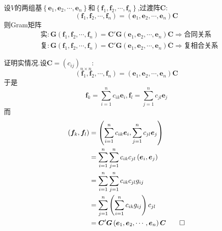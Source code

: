 \begin{green}
    \begin{lemma}[不同基之间的Gram矩阵的关系]\label{lem:不同基之间的Gram矩阵的关系}
        设$V$的两组基$\left\{
            \bm{e}_1,\bm{e}_2,\cdots,\bm{e}_n
        \right\}$和$\left\{
            \bm{f}_1,\bm{f}_2,\cdots,\bm{f}_n
            \right\}$,过渡阵$\bm{C}:$\[
            \left(
                \bm{f}_1,\bm{f}_2,\cdots,\bm{f}_n
            \right)=\left(
                \bm{e}_1,\bm{e}_2,\cdots,\bm{e}_n
            \right)\bm{C}
            \]则\textup{Gram}矩阵\begin{align*}
                &\text{实}:\bm{G}\left(
                    \bm{f}_1,\bm{f}_2,\cdots,\bm{f}_n
                \right)=\bm{C}'\bm{G}\left(
                    \bm{e}_1,\bm{e}_2,\cdots,\bm{e}_n
                \right)\bm{C}\Longrightarrow\text{合同关系}\\
               & \text{复}:\bm{G}\left(
                    \bm{f}_1,\bm{f}_2,\cdots,\bm{f}_n
                \right)=\bm{C}'\bm{G}\left(
                    \bm{e}_1,\bm{e}_2,\cdots,\bm{e}_n
                \right)\overline{\bm{C}}\Longrightarrow\text{复相合关系}
            \end{align*}
    \end{lemma}
    \begin{Proof}
        证明实情况.设$\bm{C}=\left(c_{ij}\right)_{n\times n}:$\[
        \left(
            \bm{f}_1,\bm{f}_2,\cdots,\bm{f}_n
        \right)=\left(
            \bm{e}_1,\bm{e}_2,\cdots,\bm{e}_n
            \right)\bm{C}
        \]于是\[
        \bm{f}_k=\sum_{i=1}^{n}c_{ik}\bm{e}_i,\bm{f}_l=\sum_{j=1}^{n}c_{jl}\bm{e}_j
        \]而\begin{align*}
            \left(\bm{f}_k,\bm{f}_l\right)&=\left(
                \sum_{i=1}^{n}c_{ik}\bm{e}_i,\sum_{j=1}^{n}c_{jl}\bm{e}_j
            \right)\\
            &=\sum_{i=1}^{n}\sum_{j=1}^{n}c_{ik}c_{jl}\left(
                \bm{e}_i,\bm{e}_j
            \right)\\
            &=\sum_{i=1}^{n}\sum_{j=1}^{n}c_{ik}c_{jl}g_{ij}\\
            &=\sum_{j=1}^{n}\left(
                \sum_{i=1}^{n}c_{ik}g_{ij}
            \right)c_{jl}\\
            &=\bm{C}'\bm{G}\left(
                \bm{e}_1,\bm{e}_2,\cdots,\bm{e}_n
            \right)\bm{C}\qedhere
        \end{align*}
    \end{Proof}
\end{green}
